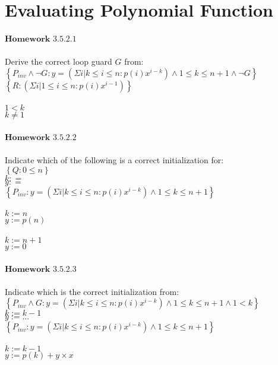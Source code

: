 \documentclass{article}
\author{Krystal Maughan }
\date{May 4th 2017}
\begin{document}
\section{Evaluating Polynomial Function}
$\mathbf{Homework}$ $\mathbf{3.5.2.1}$
\\
\\
Derive the correct loop guard $G$ from:
\\
$\left\{P_{inv} \land \neg G : y = (\Sigma i | k \leq i \leq n : p(i)x^{i - k}) \land 1 \leq k \leq n + 1 \land \neg G\right\}$
\\
$\left\{ R : (\Sigma i | 1 \leq i \leq n : p(i) x^{i - 1})\right\}$
\\
\\
$ 1 < k$
\\
$k \neq 1$
\\
\\
$\mathbf{Homework}$ $\mathbf{3.5.2.2}$
\\
\\
Indicate which of the following is a correct initialization for:
\\
$\left\{ Q : 0 \leq n\right\}$
\\
$k : = $
\\
$ y : = $
\\
$\left\{P_{inv} : y = (\Sigma i | k \leq i \leq n : p(i) x^{i - k}) \land 1 \leq k \leq n + 1\right\}$
\\
\\
$k := n$
\\
$y := p(n)$
\\
\\
$k := n + 1$
\\
$y := 0$
\\
\\
$\mathbf{Homework}$ $\mathbf{3.5.2.3}$
\\
\\
Indicate which is the correct initialization from:
\\
$\left\{P_{inv} \land G: y = (\Sigma i | k \leq i \leq n : p(i) x^{i - k}) \land 1 \leq k \leq n + 1 \land 1 < k\right\}$
\\
$k := k - 1$
\\
$y := ...$
\\
$\left\{P_{inv} : y = (\Sigma i | k \leq i \leq n : p(i) x^{i - k}) \land 1 \leq k \leq n + 1\right\}$
\\
\\
$k := k - 1$
\\
$y := p(k) + y \times x$
\end{document}
